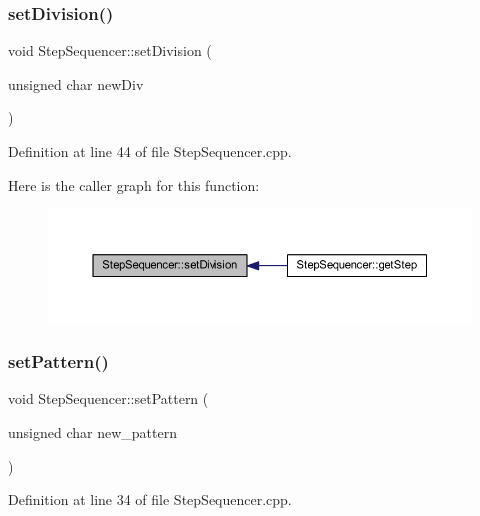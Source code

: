 \subsubsection{\texorpdfstring{set\+Division()}{setDivision()}}
{\footnotesize\ttfamily void Step\+Sequencer\+::set\+Division (\begin{DoxyParamCaption}\item[{unsigned char}]{new\+Div }\end{DoxyParamCaption})}



Definition at line 44 of file Step\+Sequencer.\+cpp.

Here is the caller graph for this function\+:
\nopagebreak
\begin{figure}[H]
\begin{center}
\leavevmode
\includegraphics[width=350pt]{dc/d87/class_step_sequencer_a5d62b641961ca9eaef9273efb9ed38b0_icgraph}
\end{center}
\end{figure}
\mbox{\label{class_step_sequencer_ac611afad54d4336977925b7f3495e8b4}} 
\subsubsection{\texorpdfstring{set\+Pattern()}{setPattern()}}
{\footnotesize\ttfamily void Step\+Sequencer\+::set\+Pattern (\begin{DoxyParamCaption}\item[{unsigned char}]{new\+\_\+pattern }\end{DoxyParamCaption})}



Definition at line 34 of file Step\+Sequencer.\+cpp.

